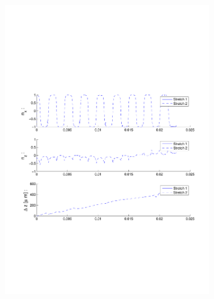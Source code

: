 \begin{figure}[ H]

\centering

\includegraphics[width=0.8\textwidth]{Images/Particle 19/Stretch1.pdf}

\end{figure}

